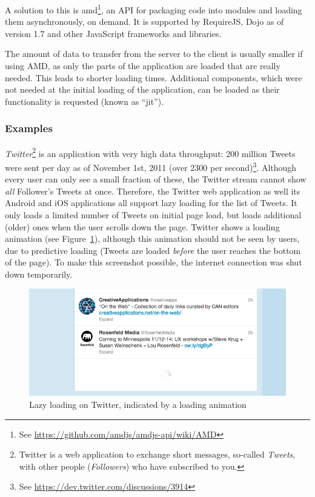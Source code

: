 A solution to this is \ac{amd}\label{term:amd}\footnote{See \url{https://github.com/amdjs/amdjs-api/wiki/AMD}}, an API for packaging code into modules and loading them asynchronously, on demand. It is supported by RequireJS, Dojo as of version 1.7 and other JavaScript frameworks and libraries.

The amount of data to transfer from the server to the client is usually smaller if using AMD, as only the parts of the application are loaded that are really needed. This leads to shorter loading times. Additional components, which were not needed at the initial loading of the application, can be loaded as their functionality is requested (known as ``\ac{jit}'').

\subsubsection{Examples}
\emph{Twitter}\footnote{Twitter is a web application to exchange short messages, so-called \emph{Tweets}, with other people (\emph{Followers}) who have subscribed to you.} is an application with very high data throughput: 200 million Tweets were sent per day as of November 1st, 2011 (over 2300 per second)\footnote{See \url{https://dev.twitter.com/discussions/3914}}. Although every user can only see a small fraction of these, the Twitter stream cannot show \emph{all} Follower's Tweets at once. Therefore, the Twitter web application as well its Android and iOS applications all support lazy loading for the list of Tweets. It only loads a limited number of Tweets on initial page load, but loads additional (older) ones when the user scrolls down the page. Twitter shows a loading animation (see Figure~\ref{fig:ll}), although this animation should not be seen by users, due to predictive loading (Tweets are loaded \emph{before} the user reaches the bottom of the page). To make this screenshot possible, the internet connection was shut down temporarily.

\begin{figure}[H]
	\centering
	\includegraphics[width=14cm]{screens/twitter_ll.png}
	\caption{Lazy loading on Twitter, indicated by a loading animation}
	\label{fig:ll}
\end{figure}

